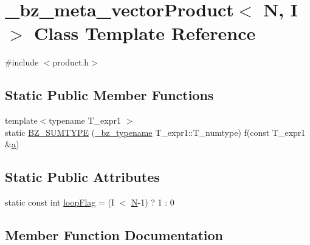 \hypertarget{class__bz__meta__vectorProduct}{}\section{\+\_\+bz\+\_\+meta\+\_\+vector\+Product$<$ N, I $>$ Class Template Reference}
\label{class__bz__meta__vectorProduct}


{\ttfamily \#include $<$product.\+h$>$}

\subsection*{Static Public Member Functions}
\begin{DoxyCompactItemize}
\item 
{\footnotesize template$<$typename T\+\_\+expr1 $>$ }\\static \hyperlink{class__bz__meta__vectorProduct_a4d817ddff450f62b1c573256f25300f7}{B\+Z\+\_\+\+S\+U\+M\+T\+Y\+P\+E} (\hyperlink{compiler_8h_a1bc40add3e72effc9cf69dbe445cbdfd}{\+\_\+bz\+\_\+typename} T\+\_\+expr1\+::\+T\+\_\+numtype) f(const T\+\_\+expr1 \&\hyperlink{gen__mat5files_8m_aae328bf20413f220e38aec4d95bfd6da}{a})
\end{DoxyCompactItemize}
\subsection*{Static Public Attributes}
\begin{DoxyCompactItemize}
\item 
static const int \hyperlink{class__bz__meta__vectorProduct_a3df74d039ea69157b8f9618a22bb8176}{loop\+Flag} = (I $<$ \hyperlink{polmisc_8c_a0240ac851181b84ac374872dc5434ee4}{N}-\/1) ? 1 \+: 0
\end{DoxyCompactItemize}


\subsection{Member Function Documentation}
\hypertarget{class__bz__meta__vectorProduct_a4d817ddff450f62b1c573256f25300f7}{}
